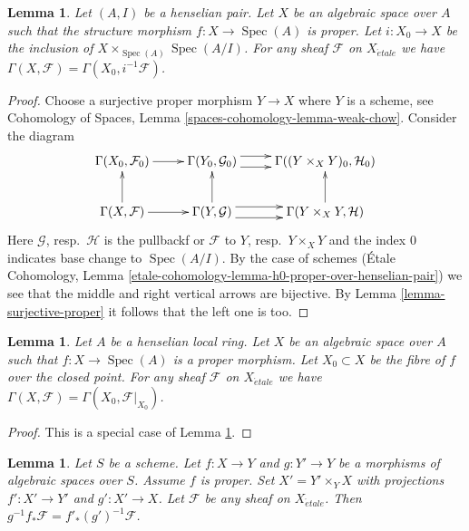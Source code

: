 \documentclass{stacks-project}
\theoremstyle{plain}
\newtheorem{lemma}[subsection]{Lemma}
\theoremstyle{definition}
\theoremstyle{remark}
\numberwithin{equation}{subsection}
\def\Spec{\mathop{\mathrm{Spec}}}
\def\etale{{\acute{e}tale}}
\begin{document}
\begin{lemma}
\label{lemma-h0-proper-over-henselian-pair}
Let $(A, I)$ be a henselian pair. Let $X$ be an algebraic space over $A$
such that the structure morphism $f : X \to \Spec(A)$ is proper.
Let $i : X_0 \to X$ be the inclusion of $X \times_{\Spec(A)} \Spec(A/I)$.
For any sheaf $\mathcal{F}$ on $X_\etale$ we
have $\Gamma(X, \mathcal{F}) = \Gamma(X_0, i^{-1}\mathcal{F})$.
\end{lemma}

\begin{proof}
Choose a surjective proper morphism $Y \to X$ where $Y$ is a scheme, see
Cohomology of Spaces, Lemma \ref{spaces-cohomology-lemma-weak-chow}.
Consider the diagram
$$
\xymatrix{
\Gamma(X_0, \mathcal{F}_0) \ar[r] &
\Gamma(Y_0, \mathcal{G}_0) \ar@<1ex>[r] \ar@<-1ex>[r] &
\Gamma((Y \times_X Y)_0, \mathcal{H}_0) \\
\Gamma(X, \mathcal{F}) \ar[r] \ar[u] &
\Gamma(Y, \mathcal{G}) \ar@<1ex>[r] \ar@<-1ex>[r] \ar[u] &
\Gamma(Y \times_X Y, \mathcal{H}) \ar[u]
}
$$
Here $\mathcal{G}$, resp.\ $\mathcal{H}$ is the pullbackf or
$\mathcal{F}$ to $Y$, resp.\ $Y \times_X Y$ and the index $0$
indicates base change to $\Spec(A/I)$. By the case of schemes
(\'Etale Cohomology, Lemma
\ref{etale-cohomology-lemma-h0-proper-over-henselian-pair})
we see that the middle and right vertical arrows are bijective.
By Lemma \ref{lemma-surjective-proper} it follows that the left one is too.
\end{proof}

\begin{lemma}
\label{lemma-h0-proper-over-henselian-local}
Let $A$ be a henselian local ring. Let $X$ be an algebraic space
over $A$ such that $f : X \to \Spec(A)$
is a proper morphism. Let $X_0 \subset X$ be the fibre of
$f$ over the closed point. For any sheaf $\mathcal{F}$ on $X_\etale$ we
have $\Gamma(X, \mathcal{F}) = \Gamma(X_0, \mathcal{F}|_{X_0})$.
\end{lemma}

\begin{proof}
This is a special case of Lemma \ref{lemma-h0-proper-over-henselian-pair}.
\end{proof}

\begin{lemma}
\label{lemma-proper-base-change-f-star}
Let $S$ be a scheme. Let $f : X \to Y$ and $g : Y' \to Y$
be a morphisms of algebraic spaces over $S$. Assume $f$ is proper.
Set $X' = Y' \times_Y X$ with projections $f' : X' \to Y'$ and $g' : X' \to X$.
Let $\mathcal{F}$ be any sheaf on $X_\etale$. Then
$g^{-1}f_*\mathcal{F} = f'_*(g')^{-1}\mathcal{F}$.
\end{lemma}
\end{document}
